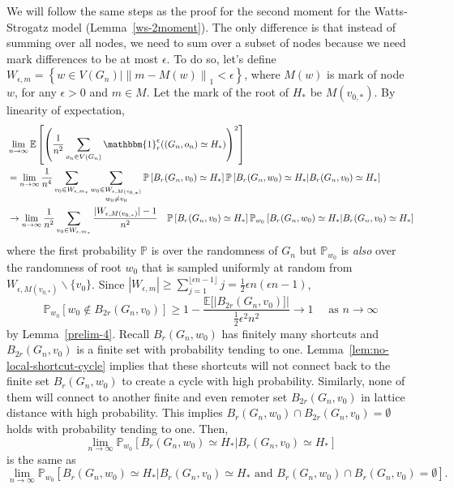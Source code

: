 \documentclass[10pt]{amsart}
\begin{document}
We will follow the same steps as the proof for the second moment for the Watts-Strogatz model (Lemma~\ref{ws-2moment}). The only difference is that instead of summing over all nodes, we need to sum over a subset of nodes because we need mark differences to be at most $\epsilon$. To do so, let's define 
$W_{\epsilon, m} = \left\{w \in V(G_n) \big| \left\|m - M(w) \right\|_1 < \epsilon \right\}$, where $M(w)$ is mark of node $w$, for any $\epsilon > 0$ and $m \in M$. Let the mark of the root of $H_*$ be $M(v_{0, *})$. By linearity of expectation,
\begin{equation} \label{goal-4}
    \begin{split}
&\lim_{n \to \infty} \mathbb{E}\left[\left(\frac{1}{n^2} \sum_{o_n\in V(G_n)}  \mathbbm{1}_r^\epsilon((G_n,o_n)\simeq H_*) \right)^2 \right] \\ 
    &= \lim_{n \to \infty} \frac{1}{n^4} \sum_{v_0 \in W_{\epsilon, m_*} } \sum_{\substack{w_0 \in W_{\epsilon, M(v_{0, *})} \\ w_0 \neq v_0}} \mathbb{P}\left[B_r(G_n,v_0)\simeq H_*  \right] \mathbb{P}\left[B_r(G_n,w_0)\simeq H_*  | B_r(G_n,v_0)\simeq H_* \right] \\
    &\to \lim_{n \to \infty} \frac{1}{n^2} \sum_{v_0 \in W_{\epsilon,m_*}} \frac{|W_{\epsilon,M(v_{0, *})}|-1}{n^2} \quad \mathbb{P}\left[B_r(G_n,v_0)\simeq H_*  \right] \mathbb{P}_{w_0}\left[B_r(G_n,w_0)\simeq H_*  | B_r(G_n,v_0)\simeq H_* \right]
    \end{split}
\end{equation}
where the first probability $\mathbb{P}$ is over the randomness of $G_n$ but $\mathbb{P}_{w_0}$ is \textit{also} over the randomness of root $w_0$ that is sampled uniformly at random from $W_{\epsilon, M(v_{0, *})} \backslash \{v_0\}$. Since $|W_{\epsilon,m}| \geq \sum_{j=1}^{\lfloor \epsilon n - 1 \rfloor} j = \frac{1}{2} \epsilon n ( \epsilon n - 1)$,
$$\mathbb{P}_{w_0}[w_0 \notin B_{2r}(G_n,v_0)] \geq 1- \frac{\mathbb{E}[|B_{2r}(G_n,v_0)]|}{\frac{1}{2}\epsilon^2 n^2} \to 1 \quad \text{ as $n \to \infty$}$$ 
by Lemma~\ref{prelim-4}. Recall $B_r(G_n,w_0)$ has finitely many shortcuts and $B_{2r}(G_n,v_0)$ is a finite set with probability tending to one. Lemma~\ref{lem:no-local-shortcut-cycle} implies that these shortcuts will not connect back to the finite set $B_r(G_n,w_0)$ to create a cycle with high probability. Similarly, none of them will connect to another finite and even remoter set $B_{2r}(G_n,v_0)$ in lattice distance with high probability. This implies $B_r(G_n,w_0) \cap B_{2r}(G_n,v_0) = \emptyset$ holds with probability tending to one. Then, $$\lim_{n \to \infty}  
 \mathbb{P}_{w_0}\left[B_r(G_n,w_0)\simeq H_*  | B_r(G_n,v_0)\simeq H_* \right]$$ is the same as
$$\lim_{n \to \infty} \mathbb{P}_{w_0}\left[B_r(G_n,w_0) \simeq H_* \big| B_r(G_n,v_0) \simeq H_*  \text{ and } 
B_r(G_n,w_0) \cap B_{r}(G_n,v_0) = \emptyset \right].$$
\end{document}
